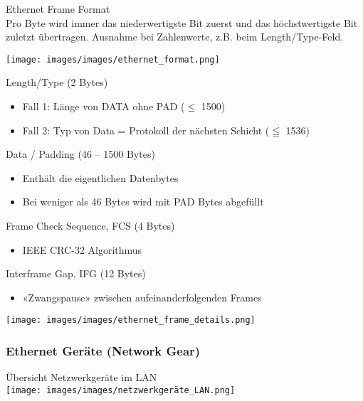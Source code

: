 \begin{definition}{Ethernet Frame Format}\\
    Pro Byte wird immer das niederwertigste Bit zuerst und das höchstwertigste Bit zuletzt übertragen. Ausnahme bei Zahlenwerte, z.B. beim Length/Type-Feld.\\
    \begin{minipage}{0.4\linewidth}
        \texttt{[image: images/images/ethernet\_format.png]}
    \end{minipage}
    \begin{minipage}{0.6\linewidth}
    Length/Type (2 Bytes)
    \begin{itemize}
        \item Fall 1: Länge von DATA ohne PAD ($\leq$ 1500)
        \item Fall 2: Typ von Data = Protokoll der nächsten Schicht ($\leqq$ 1536)
    \end{itemize}
    Data / Padding (46 – 1500 Bytes)
    \begin{itemize}
        \item Enthält die eigentlichen Datenbytes
        \item Bei weniger als 46 Bytes wird mit PAD Bytes abgefüllt
    \end{itemize}
    Frame Check Sequence, FCS (4 Bytes)
    \begin{itemize}
        \item IEEE CRC-32 Algorithmus
    \end{itemize}
    Interframe Gap, IFG (12 Bytes)
    \begin{itemize}
        \item «Zwangspause» zwischen aufeinanderfolgenden Frames
    \end{itemize}
    \end{minipage}
    \vspace{1mm} 
    \begin{center}
        \texttt{[image: images/images/ethernet\_frame\_details.png]}
    \end{center}       
\end{definition}

\subsubsection{Ethernet Geräte (Network Gear)}

\begin{definition}{Übersicht Netzwerkgeräte im LAN}\\
    \texttt{[image: images/images/netzwerkgeräte\_LAN.png]}
\end{definition}


